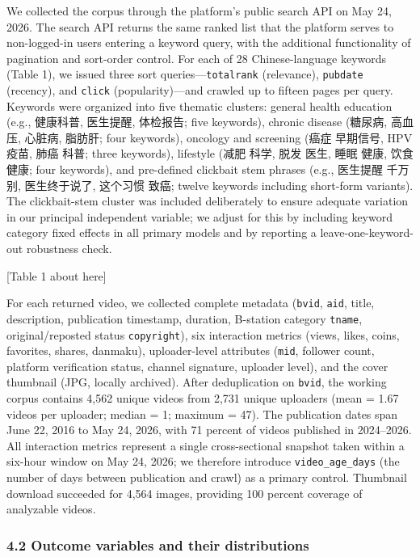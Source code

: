 \documentclass[
  12pt,
]{article}
\begin{document}
We collected the corpus through the platform's public search API on May
24, 2026. The search API returns the same ranked list that the platform
serves to non-logged-in users entering a keyword query, with the
additional functionality of pagination and sort-order control. For each
of 28 Chinese-language keywords (Table 1), we issued three sort
queries---\texttt{totalrank} (relevance), \texttt{pubdate} (recency),
and \texttt{click} (popularity)---and crawled up to fifteen pages per
query. Keywords were organized into five thematic clusters: general
health education (e.g., 健康科普, 医生提醒, 体检报告; five keywords),
chronic disease (糖尿病, 高血压, 心脏病, 脂肪肝; four keywords),
oncology and screening (癌症 早期信号, HPV 疫苗, 肺癌 科普; three
keywords), lifestyle (减肥 科学, 脱发 医生, 睡眠 健康, 饮食健康; four
keywords), and pre-defined clickbait stem phrases (e.g., 医生提醒
千万别, 医生终于说了, 这个习惯 致癌; twelve keywords including
short-form variants). The clickbait-stem cluster was included
deliberately to ensure adequate variation in our principal independent
variable; we adjust for this by including keyword category fixed effects
in all primary models and by reporting a leave-one-keyword-out
robustness check.

{[}Table 1 about here{]}

For each returned video, we collected complete metadata (\texttt{bvid},
\texttt{aid}, title, description, publication timestamp, duration,
B-station category \texttt{tname}, original/reposted status
\texttt{copyright}), six interaction metrics (views, likes, coins,
favorites, shares, danmaku), uploader-level attributes (\texttt{mid},
follower count, platform verification status, channel signature,
uploader level), and the cover thumbnail (JPG, locally archived). After
deduplication on \texttt{bvid}, the working corpus contains 4,562 unique
videos from 2,731 unique uploaders (mean = 1.67 videos per uploader;
median = 1; maximum = 47). The publication dates span June 22, 2016 to
May 24, 2026, with 71 percent of videos published in 2024--2026. All
interaction metrics represent a single cross-sectional snapshot taken
within a six-hour window on May 24, 2026; we therefore introduce
\texttt{video\_age\_days} (the number of days between publication and
crawl) as a primary control. Thumbnail download succeeded for 4,564
images, providing 100 percent coverage of analyzable videos.

\subsubsection{4.2 Outcome variables and their
distributions}\label{outcome-variables-and-their-distributions}
\end{document}
